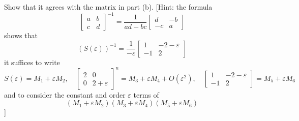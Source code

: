 \documentclass{article}
\newcommand{\ep}{{\varepsilon}}
\begin{document}
\begin{enumerate}
		Show that it agrees with the matrix in part (b). [Hint: the formula
		\[
			\begin{bmatrix} a & b \\ c & d \end{bmatrix}^{-1}
			= \frac{1}{ad-bc}\begin{bmatrix} d & -b \\ -c & a \end{bmatrix}
		\]
		shows that
		\[
			(S(\ep))^{-1} = \frac{1}{-\ep}\begin{bmatrix} 1 & -2-\ep \\ -1 & 2 \end{bmatrix}
		\]
		it suffices to write
		\[
			S(\ep) = M_1 + \ep M_2, \quad
			\begin{bmatrix} 2 & 0 \\ 0 & 2 + \ep\end{bmatrix}^n =
			M_3 + \ep M_4 + O(\ep^2),\quad
			\begin{bmatrix} 1 & -2-\ep \\ -1 & 2 \end{bmatrix} = M_5 + \ep M_6
		\]
		and to consider the constant and order $\ep$ terms of
		\[
			(M_1 + \ep M_2)(M_3 + \ep M_4)(M_5 + \ep M_6)
		\]
		]
\end{enumerate}
\end{document}
